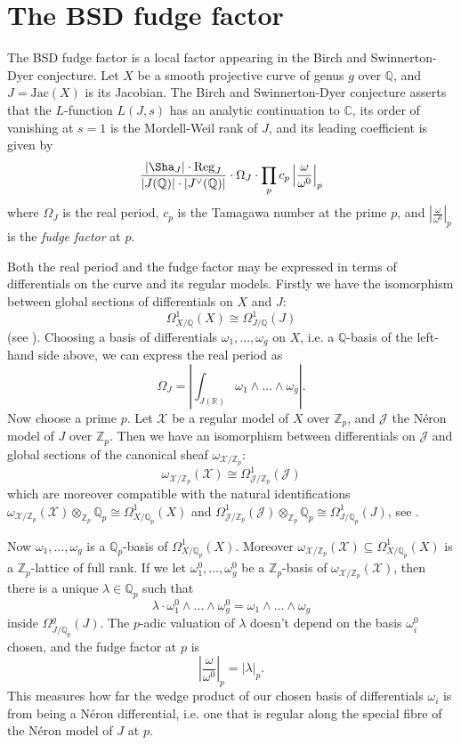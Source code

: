 \documentclass{article}
\theoremstyle{definition}
\theoremstyle{plain}
\theoremstyle{remark}
\newcommand{\Jac}{\mathrm{Jac}}
\begin{document}
	\section{The BSD fudge factor}\label{section_fudge_factor}
	The BSD fudge factor is a local factor appearing in the Birch and Swinnerton-Dyer conjecture. Let $X$ be a smooth projective curve of genus $g$ over $\mathbb{Q}$, and $J = \Jac(X)$ is its Jacobian. The Birch and Swinnerton-Dyer conjecture asserts that the $L$-function $L(J, s)$ has an analytic continuation to $\mathbb{C}$, its order of vanishing at $s=1$ is the Mordell-Weil rank of $J$, and its leading coefficient is given by
	\[\frac{|\Sha_J|\cdot \textrm{Reg}_J}{|J(\mathbb{Q})|\cdot |J^{\vee}(\mathbb{Q})|}\cdot \Omega_J \cdot \prod_p c_p\left|\frac{\omega}{\omega^0}\right|_p \]
	where $\Omega_J$ is the real period, $c_p$ is the Tamagawa number at the prime $p$, and $\left|\frac{\omega}{\omega^0}\right|_p$ is the \emph{fudge factor} at $p$. 
	
	Both the real period and the fudge factor may be expressed in terms of differentials on the curve and its regular models. Firstly we have the isomorphism between global sections of differentials on $X$ and $J$:
	\[\Omega^1_{X/\mathbb{Q}}(X)\cong \Omega^1_{J/\mathbb{Q}}(J)\]
	(see \cite[Proposition 2.2]{Milne1986}). Choosing a basis of differentials $\omega_1, \ldots, \omega_g$ on $X$, i.e. a $\mathbb{Q}$-basis of the left-hand side above, we can express the real period as
	\[\Omega_J = \left|\int_{J(\mathbb{R})}\omega_1\wedge \ldots \wedge \omega_g\right|.\]
	Now choose a prime $p$. Let $\mathcal{X}$ be a regular model of $X$ over $\mathbb{Z}_p$, and $\mathcal{J}$ the Néron model of $J$ over $\mathbb{Z}_p$. Then we have an isomorphism between differentials on $\mathcal{J}$ and global sections of the canonical sheaf $\omega_{\mathcal{X}/\mathbb{Z}_p}$:
	\[\omega_{\mathcal{X}/\mathbb{Z}_p}(\mathcal{X}) \cong \Omega^1_{\mathcal{J}/\mathbb{Z}_p}(\mathcal{J})\]
	which are moreover compatible with the natural identifications $\omega_{\mathcal{X}/\mathbb{Z}_p}(\mathcal{X})\otimes_{\mathbb{Z}_p} \mathbb{Q}_p \cong \Omega^1_{X/\mathbb{Q}_p}(X)$ and $\Omega^1_{\mathcal{J}/\mathbb{Z}_p}(\mathcal{J})\otimes_{\mathbb{Z}_p} \mathbb{Q}_p \cong \Omega^1_{J/\mathbb{Q}_p}(J)$, see \cite[Lemma 9]{vanBommel02012022}.
	
	Now $\omega_1, \ldots, \omega_g$ is a $\mathbb{Q}_p$-basis of $\Omega^1_{X/\mathbb{Q}_p}(X)$. Moreover $\omega_{\mathcal{X}/\mathbb{Z}_p}(\mathcal{X})\subseteq \Omega^1_{X/\mathbb{Q}_p}(X)$ is a $\mathbb{Z}_p$-lattice of full rank. If we let $\omega^0_1, \ldots, \omega^0_g$ be a $\mathbb{Z}_p$-basis of $\omega_{\mathcal{X}/\mathbb{Z}_p}(\mathcal{X})$, then there is a unique $\lambda \in \mathbb{Q}_p$ such that
	\[\lambda\cdot \omega^0_1\wedge \ldots \wedge \omega^0_g = \omega_1\wedge \ldots \wedge \omega_g\]
	inside $\Omega^g_{J/\mathbb{Q}_p}(J)$. The $p$-adic valuation of $\lambda$ doesn't depend on the basis $\omega^0_i$ chosen, and the fudge factor at $p$ is
	\[\left|\frac{\omega}{\omega^0}\right|_p = |\lambda|_p.\]
	This measures how far the wedge product of our chosen basis of differentials $\omega_i$ is from being a Néron differential, i.e. one that is regular along the special fibre of the Néron model of $J$ at $p$.
	
\end{document}
